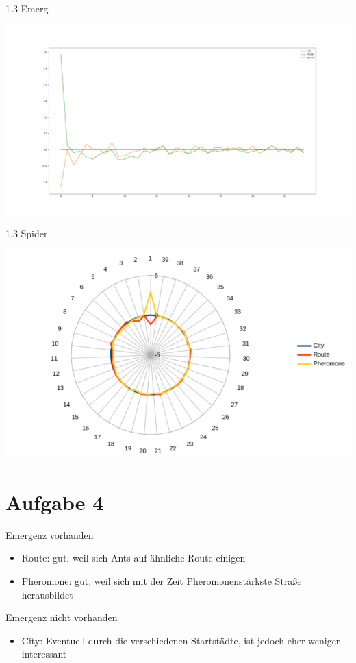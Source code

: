 \documentclass{ocbeameruni}
\begin{document}
\begin{frame}{1.3 Emerg}
    \begin{center}
    \includegraphics[scale=0.2]{Emerg_per_iter.png}
    \end{center}
\end{frame}

\begin{frame}{1.3 Spider}
    \begin{center}
    \includegraphics[scale=0.5]{spider_emerg.png}
    \end{center}
\end{frame}

\section{Aufgabe 4}

\begin{frame}{Emergenz vorhanden}
    \begin{itemize}
    \item Route: gut, weil sich Ants auf ähnliche Route einigen
    \item Pheromone: gut, weil sich mit der Zeit Pheromonenstärkste Straße herausbildet
    \end{itemize}
\end{frame}

\begin{frame}{Emergenz nicht vorhanden}
    \begin{itemize}
    \item City: Eventuell durch die verschiedenen Startstädte, ist jedoch eher weniger interessant
    \end{itemize}
\end{frame}
\end{document}
